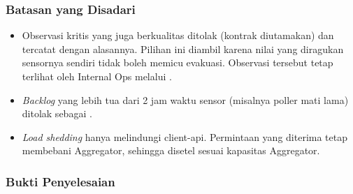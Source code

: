 \subsubsection{Batasan yang Disadari}
\begin{itemize}
\item Observasi kritis yang juga berkualitas  ditolak (kontrak diutamakan) dan tercatat dengan alasannya. Pilihan ini diambil karena nilai yang diragukan sensornya sendiri tidak boleh memicu evakuasi. Observasi tersebut tetap terlihat oleh Internal Ops melalui .
\item \textit{Backlog} yang lebih tua dari 2 jam waktu sensor (misalnya poller mati lama) ditolak sebagai .
\item \textit{Load shedding} hanya melindungi client-api. Permintaan yang diterima tetap membebani Aggregator, sehingga  disetel sesuai kapasitas Aggregator.
\end{itemize}

\subsubsection{Bukti Penyelesaian}

